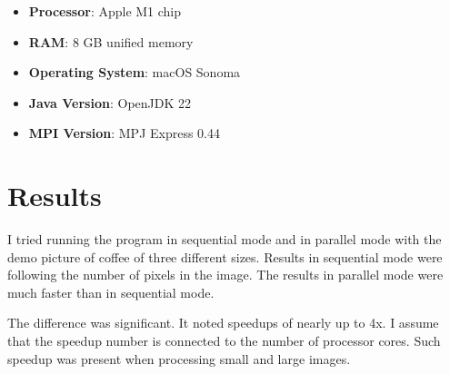 \documentclass{article}
\begin{document}
\begin{multicols}{2}
    \begin{itemize}
        \item \textbf{Processor}: Apple M1 chip
        \item \textbf{RAM}: 8 GB unified memory
        \item \textbf{Operating System}: macOS Sonoma
        \item \textbf{Java Version}: OpenJDK 22
        \item \textbf{MPI Version}: MPJ Express 0.44
    \end{itemize}

    \section{Results}

    I tried running the program in sequential mode and in parallel mode with the demo picture of coffee of three different sizes. Results in sequential mode were following the number of pixels in the image. The results in parallel mode were much faster than in sequential mode.

    The difference was significant. It noted speedups of nearly up to 4x. I assume that the speedup number is connected to the number of processor cores. Such speedup was present when processing small and large images.


\end{multicols}
\end{document}
